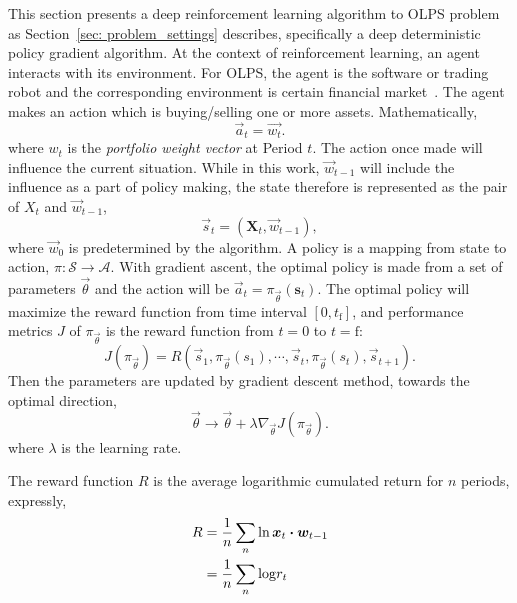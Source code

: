 This section presents a deep reinforcement learning algorithm to OLPS problem as Section~\ref{sec: problem_settings} describes, specifically a deep deterministic policy gradient algorithm. At the context of reinforcement learning, an agent interacts with its environment. For OLPS, the agent is the software or trading robot and the corresponding environment is certain financial market~\cite{jiang2017deep}. The agent makes an action which is buying/selling one or more assets. Mathematically,
\begin{equation}  \label{eq:action}
	\vec a_t = \vec{w_t}.
\end{equation}
where $w_t$ is the \emph{portfolio weight vector} at Period $t$. The action once made will influence the current situation. While in this work, $\vec{w}_{t-1}$ will include the influence as a part of policy making, the state therefore is represented as the pair of $X_t$ and $\vec{w}_{t-1}$,
\begin{equation} \label{eq:state}
	\vec s_t = (\bm X_t, \vec w_{t-1}),
\end{equation}
where $\vec w_0$ is predetermined by the algorithm. A policy is a mapping from state to action, $\pi:\mathcal{S}\rightarrow\mathcal{A}$. With gradient ascent, the optimal policy is made from a set of parameters $\vec{\theta}$ and the action will be $\vec a_t = \pi_{\vec \theta}(\bm s_t)$. The optimal policy will maximize the reward function from time interval $[0,t_\mathrm{f}]$, and performance metrics $J$ of $\pi_{\vec \theta}$ is the reward function from $t=0$ to $t=\mathrm{f}$:
\begin{equation}
	J(\pi_{\vec \theta}) = R\left( \vec s_1,\pi_{\vec \theta}(s_1),\cdots,
		\vec s_{t},\pi_{\vec \theta}(s_{t}),\vec s_{t+1} \right).
	\label{eq:policy_value}
\end{equation}
Then the parameters are updated by gradient descent method, towards the optimal direction,
\begin{equation}
	\vec\theta \longrightarrow \vec\theta + \lambda\nabla_{\vec\theta}J(\pi_{\vec \theta}).
	\label{eq:gradient_ascent}
\end{equation}
where $\lambda$ is the learning rate.

The reward function $R$ is the average logarithmic cumulated return for $n$ periods, expressly,
\begin{align}
	R &= \frac{1}{n} \sum_n \ln \bm x_{t} \boldsymbol{\cdot} \bm w_{t-1} \\
	  &= \frac{1}{n} \sum_n \mathrm{log}r_t
\end{align}


